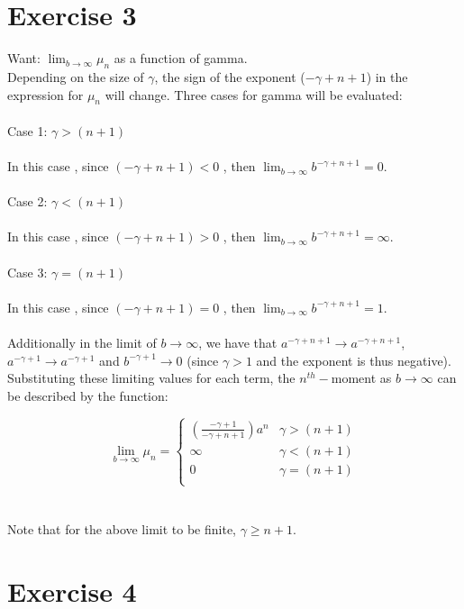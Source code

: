 \documentclass{article}
\begin{document}
\section{Exercise 3}

Want: $\lim_{b\to\infty} \mu_n$ as a function of gamma. 
\\
Depending on the size of $\gamma$, the sign of the exponent ($-\gamma+n+1$) in the expression for $\mu_n$ will change. Three cases for gamma will be evaluated: \\
\\
Case 1: $\gamma > (n+1)$ \\
\\
In this case , since $(-\gamma+n+1) < 0$ , then $\lim_{b\to \infty} b^{-\gamma+n+1} = 0$. \\
\\
Case 2: $\gamma < (n+1)$ \\
\\
In this case , since $(-\gamma+n+1) > 0$ , then $\lim_{b\to \infty} b^{-\gamma+n+1} = \infty $. \\
\\
Case 3: $\gamma = (n+1)$ \\
\\
In this case , since $(-\gamma+n+1) = 0$ , then $\lim_{b\to \infty} b^{-\gamma+n+1} = 1$. \\
\\
Additionally in the limit of $b\to\infty$, we have that $a^{-\gamma+n+1} \to a^{-\gamma+n+1}$, $a^{-\gamma+1} \to a^{-\gamma+1}$ and $b^{-\gamma+1} \to 0$ (since $\gamma > 1$ and the exponent is thus negative). Substituting these limiting values for each term, the $n^{th}-$moment as $b\to\infty$ can be described by the function:

\[ \lim_{b\to\infty} \mu_n = \begin{cases}
(\frac{-\gamma+1}{-\gamma+n+1}) a^n & \gamma > (n+1) \\
\infty & \gamma < (n+1) \\
0 & \gamma = (n+1) \\
\end{cases}\] \\
\\
Note that for the above limit to be finite, $\gamma \geq n+1$.

\section{Exercise 4}
\end{document}
